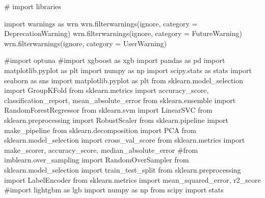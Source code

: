 \documentclass[
  letterpaper,
  DIV=11,
  numbers=noendperiod]{scrartcl}
\newenvironment{Shaded}{\begin{snugshade}}{\end{snugshade}}
\newcommand{\CommentTok}[1]{\textcolor[rgb]{0.37,0.37,0.37}{#1}}
\newcommand{\ImportTok}[1]{\textcolor[rgb]{0.00,0.46,0.62}{#1}}
\newcommand{\NormalTok}[1]{\textcolor[rgb]{0.00,0.23,0.31}{#1}}
\newcommand{\OperatorTok}[1]{\textcolor[rgb]{0.37,0.37,0.37}{#1}}
\newcommand{\PreprocessorTok}[1]{\textcolor[rgb]{0.68,0.00,0.00}{#1}}
\newcommand{\StringTok}[1]{\textcolor[rgb]{0.13,0.47,0.30}{#1}}
\begin{document}
\begin{Shaded}
\begin{Highlighting}[]
\CommentTok{\# import libraries}

\ImportTok{import}\NormalTok{ warnings }\ImportTok{as}\NormalTok{ wrn}
\NormalTok{wrn.filterwarnings(}\StringTok{\textquotesingle{}ignore\textquotesingle{}}\NormalTok{, category }\OperatorTok{=} \PreprocessorTok{DeprecationWarning}\NormalTok{) }
\NormalTok{wrn.filterwarnings(}\StringTok{\textquotesingle{}ignore\textquotesingle{}}\NormalTok{, category }\OperatorTok{=} \PreprocessorTok{FutureWarning}\NormalTok{) }
\NormalTok{wrn.filterwarnings(}\StringTok{\textquotesingle{}ignore\textquotesingle{}}\NormalTok{, category }\OperatorTok{=} \PreprocessorTok{UserWarning}\NormalTok{) }

\CommentTok{\#import optuna}
\CommentTok{\#import xgboost as xgb}
\ImportTok{import}\NormalTok{ pandas }\ImportTok{as}\NormalTok{ pd}
\ImportTok{import}\NormalTok{ matplotlib.pyplot }\ImportTok{as}\NormalTok{ plt}
\ImportTok{import}\NormalTok{ numpy }\ImportTok{as}\NormalTok{ np}
\ImportTok{import}\NormalTok{ scipy.stats }\ImportTok{as}\NormalTok{ stats}
\ImportTok{import}\NormalTok{ seaborn }\ImportTok{as}\NormalTok{ sns}
\ImportTok{import}\NormalTok{ matplotlib.pyplot }\ImportTok{as}\NormalTok{ plt}
\ImportTok{from}\NormalTok{ sklearn.model\_selection }\ImportTok{import}\NormalTok{ GroupKFold}
\ImportTok{from}\NormalTok{ sklearn.metrics }\ImportTok{import}\NormalTok{ accuracy\_score, classification\_report, mean\_absolute\_error}
\ImportTok{from}\NormalTok{ sklearn.ensemble }\ImportTok{import}\NormalTok{ RandomForestRegressor}
\ImportTok{from}\NormalTok{ sklearn.svm }\ImportTok{import}\NormalTok{ LinearSVC}
\ImportTok{from}\NormalTok{ sklearn.preprocessing }\ImportTok{import}\NormalTok{ RobustScaler}
\ImportTok{from}\NormalTok{ sklearn.pipeline }\ImportTok{import}\NormalTok{ make\_pipeline}
\ImportTok{from}\NormalTok{ sklearn.decomposition }\ImportTok{import}\NormalTok{ PCA}
\ImportTok{from}\NormalTok{ sklearn.model\_selection }\ImportTok{import}\NormalTok{ cross\_val\_score}
\ImportTok{from}\NormalTok{ sklearn.metrics }\ImportTok{import}\NormalTok{ make\_scorer, accuracy\_score, median\_absolute\_error}
\CommentTok{\#from imblearn.over\_sampling import RandomOverSampler}
\ImportTok{from}\NormalTok{ sklearn.model\_selection }\ImportTok{import}\NormalTok{ train\_test\_split}
\ImportTok{from}\NormalTok{ sklearn.preprocessing }\ImportTok{import}\NormalTok{ LabelEncoder}
\ImportTok{from}\NormalTok{ sklearn.metrics }\ImportTok{import}\NormalTok{ mean\_squared\_error, r2\_score}
\CommentTok{\#import lightgbm as lgb}
\ImportTok{import}\NormalTok{ numpy }\ImportTok{as}\NormalTok{ np}
\ImportTok{from}\NormalTok{ scipy }\ImportTok{import}\NormalTok{ stats}
\end{Highlighting}
\end{Shaded}
\end{document}
